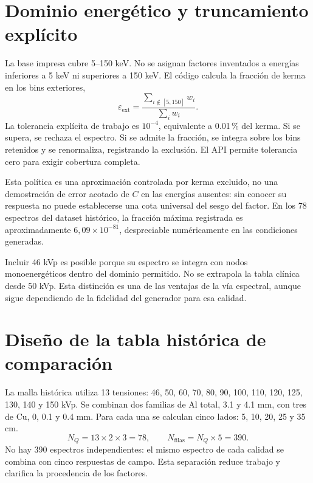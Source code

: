 \section{Dominio energético y truncamiento explícito}
La base impresa cubre 5--150 keV. No se asignan factores inventados a energías inferiores a 5 keV ni superiores a 150 keV. El código calcula la fracción de kerma en los bins exteriores,
\begin{equation}
\varepsilon_{\mathrm{ext}}=\frac{\sum_{i\notin[5,150]}w_i}{\sum_iw_i}.
\end{equation}
La tolerancia explícita de trabajo es $10^{-4}$, equivalente a \num{0.01}\,\% del kerma. Si se supera, se rechaza el espectro. Si se admite la fracción, se integra sobre los bins retenidos y se renormaliza, registrando la exclusión. El API permite tolerancia cero para exigir cobertura completa.

Esta política es una aproximación controlada por kerma excluido, no una demostración de error acotado de $C$ en las energías ausentes: sin conocer su respuesta no puede establecerse una cota universal del sesgo del factor. En los 78 espectros del dataset histórico, la fracción máxima registrada es aproximadamente $6{,}09\times10^{-81}$, despreciable numéricamente en las condiciones generadas.

Incluir 46 kVp es posible porque su espectro se integra con nodos monoenergéticos dentro del dominio permitido. No se extrapola la tabla clínica desde 50 kVp. Esta distinción es una de las ventajas de la vía espectral, aunque sigue dependiendo de la fidelidad del generador para esa calidad.

\section{Diseño de la tabla histórica de comparación}
La malla histórica utiliza 13 tensiones: 46, 50, 60, 70, 80, 90, 100, 110, 120, 125, 130, 140 y 150 kVp. Se combinan dos familias de Al total, \num{3.1} y \num{4.1} mm, con tres de Cu, 0, \num{0.1} y \num{0.4} mm. Para cada una se calculan cinco lados: 5, 10, 20, 25 y 35 cm.
\begin{equation}
N_Q=13\times2\times3=78,\qquad
N_{\mathrm{filas}}=N_Q\times5=390.
\end{equation}
No hay 390 espectros independientes: el mismo espectro de cada calidad se combina con cinco respuestas de campo. Esta separación reduce trabajo y clarifica la procedencia de los factores.

